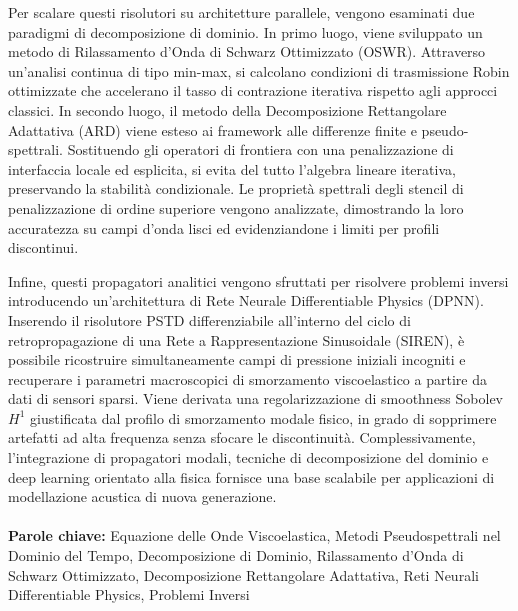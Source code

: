 \documentclass{Configuration_Files/PoliMi3i_thesis}
\begin{document}
Per scalare questi risolutori su architetture parallele, vengono esaminati due paradigmi di decomposizione di dominio. In primo luogo, viene sviluppato un metodo di Rilassamento d'Onda di Schwarz Ottimizzato (OSWR). Attraverso un'analisi continua di tipo min-max, si calcolano condizioni di trasmissione Robin ottimizzate che accelerano il tasso di contrazione iterativa rispetto agli approcci classici. In secondo luogo, il metodo della Decomposizione Rettangolare Adattativa (ARD) viene esteso ai framework alle differenze finite e pseudo-spettrali. Sostituendo gli operatori di frontiera con una penalizzazione di interfaccia locale ed esplicita, si evita del tutto l'algebra lineare iterativa, preservando la stabilità condizionale. Le proprietà spettrali degli stencil di penalizzazione di ordine superiore vengono analizzate, dimostrando la loro accuratezza su campi d'onda lisci ed evidenziandone i limiti per profili discontinui.

Infine, questi propagatori analitici vengono sfruttati per risolvere problemi inversi introducendo un'architettura di Rete Neurale Differentiable Physics (DPNN). Inserendo il risolutore PSTD differenziabile all'interno del ciclo di retropropagazione di una Rete a Rappresentazione Sinusoidale (SIREN), è possibile ricostruire simultaneamente campi di pressione iniziali incogniti e recuperare i parametri macroscopici di smorzamento viscoelastico a partire da dati di sensori sparsi. Viene derivata una regolarizzazione di smoothness Sobolev $H^1$ giustificata dal profilo di smorzamento modale fisico, in grado di sopprimere artefatti ad alta frequenza senza sfocare le discontinuità. Complessivamente, l'integrazione di propagatori modali, tecniche di decomposizione del dominio e deep learning orientato alla fisica fornisce una base scalabile per applicazioni di modellazione acustica di nuova generazione.
\\
\\
\textbf{Parole chiave:} Equazione delle Onde Viscoelastica, Metodi Pseudospettrali nel Dominio del Tempo, Decomposizione di Dominio, Rilassamento d'Onda di Schwarz Ottimizzato, Decomposizione Rettangolare Adattativa, Reti Neurali Differentiable Physics, Problemi Inversi %


\thispagestyle{empty}
\tableofcontents %
\thispagestyle{empty}
\cleardoublepage
\end{document}

